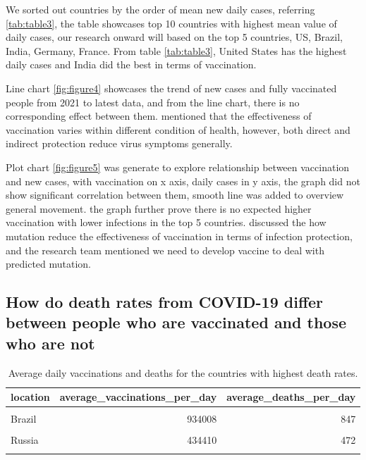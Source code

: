 \documentclass[11pt,a4paper,]{article}
\begin{document}
We sorted out countries by the order of mean new daily cases, referring \ref{tab:table3}, the table showcases top 10 countries with highest mean value of daily cases, our research onward will based on the top 5 countries, US, Brazil, India, Germany, France. From table \ref{tab:table3}, United States has the highest daily cases and India did the best in terms of vaccination.

Line chart \ref{fig:figure4} showcases the trend of new cases and fully vaccinated people from 2021 to latest data, and from the line chart, there is no corresponding effect between them. \textcite{lipsitch2020understanding} mentioned that the effectiveness of vaccination varies within different condition of health, however, both direct and indirect protection reduce virus symptoms generally.

Plot chart \ref{fig:figure5} was generate to explore relationship between vaccination and new cases, with vaccination on x axis, daily cases in y axis, the graph did not show significant correlation between them, smooth line was added to overview general movement. the graph further prove there is no expected higher vaccination with lower infections in the top 5 countries. \textcite{chen2021prediction} discussed the how mutation reduce the effectiveness of vaccination in terms of infection protection, and the research team mentioned we need to develop vaccine to deal with predicted mutation.

\clearpage

\hypertarget{how-do-death-rates-from-covid-19-differ-between-people-who-are-vaccinated-and-those-who-are-not}{%
\subsection{\texorpdfstring{\textbf{How do death rates from COVID-19 differ between people who are vaccinated and those who are not}}{How do death rates from COVID-19 differ between people who are vaccinated and those who are not}}\label{how-do-death-rates-from-covid-19-differ-between-people-who-are-vaccinated-and-those-who-are-not}}

\begin{table}[!h]

\caption{\label{tab:table}Average daily vaccinations and deaths for the countries with highest death rates.}
\centering
\begin{tabular}[t]{l|r|r}
\hline
location & average\_vaccinations\_per\_day & average\_deaths\_per\_day\\
\hline
\cellcolor{gray!6}{United States} & \cellcolor{gray!6}{1135290} & \cellcolor{gray!6}{1246}\\
\hline
Brazil & 934008 & 847\\
\hline
\cellcolor{gray!6}{India} & \cellcolor{gray!6}{4057187} & \cellcolor{gray!6}{657}\\
\hline
Russia & 434410 & 472\\
\hline
\cellcolor{gray!6}{Mexico} & \cellcolor{gray!6}{444551} & \cellcolor{gray!6}{407}\\
\hline
\end{tabular}
\end{table}
\end{document}
